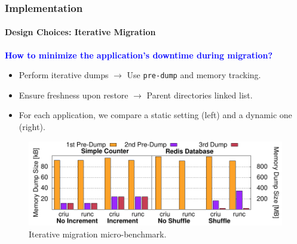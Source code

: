 \documentclass[9pt,    %
    english,            %
    xcolor=table,       %
    envcountsect,        %
    aspectratio=169     %
]{beamer}
\begin{document}
\begin{frame}
    \frametitle{Implementation}
    \framesubtitle{Design Choices: Iterative Migration}

    \vspace{10pt}

    \textbf{\textcolor{blue}{How to minimize the application's downtime during migration?}}
    \begin{itemize}
        \item Perform iterative dumps $\rightarrow$ Use \texttt{pre-dump} and memory tracking.
        \item Ensure freshness upon restore $\rightarrow$ Parent directories linked list.
        \item For each application, we compare a static setting (left) and a dynamic one (right).
    \end{itemize}

    \vspace{-5pt}

    \begin{figure}
        \centering
        \includegraphics[width=.75\textwidth]{./figs/iterative_migration_microbenchmark.pdf}
        \caption{Iterative migration micro-benchmark.\label{fig:iterative-microbecnhmark}}
    \end{figure}
    
\end{frame}
\end{document}
